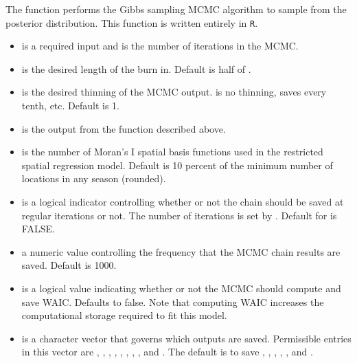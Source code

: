 The function  performs the Gibbs sampling MCMC algorithm to sample from the posterior distribution.  This function is written entirely in \texttt{R}.  

\begin{itemize}
\item {} is a required input and is the number of iterations in the MCMC.
\item {} is the desired length of the burn in.  Default is half of .
\item {} is the desired thinning of the MCMC output.  is no thinning,  saves every tenth, etc.  Default is 1.
\item {} is the output from the  function described above.
\item {} is the number of Moran's \textrm{I} spatial basis functions used in the restricted spatial regression model.  Default is 10 percent of the minimum number of locations in any season (rounded).
\item {} is a logical indicator controlling whether or not the chain should be saved at regular iterations or not.  The number of iterations is set by .  Default for  is FALSE.
\item {} a numeric value controlling the frequency that the MCMC chain results are saved.  Default is 1000.
\item {} is a logical value indicating whether or not the MCMC should compute and save WAIC.  Defaults to false. Note that computing WAIC increases the computational storage required to fit this model.
\item {} is a character vector that governs which outputs are saved.  Permissible entries in this vector are , , , , , , , , and . The default is to save , , , , , and .
\end{itemize}

